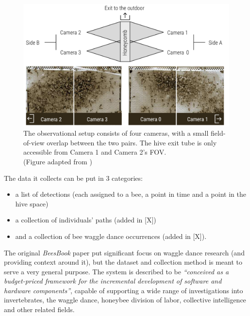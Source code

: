 \begin{figure}[htbp!] 
\centering    
\includegraphics[width=1.0\textwidth]{Chapters/Chapter1/Figs/hive-layout-schlegel.png}
\caption[hive-layout-schlegel]{The observational setup consists of four cameras, with a small field-of-view overlap between the two pairs. The hive exit tube is only accessible from Camera 1 and Camera 2's FOV.
\\(Figure adapted from \cite{schlegel_temporal_2017})}
\label{fig:hive-layout-schlegel}
\end{figure}




The data it collects can be put in 3 categories: 
\begin{itemize}
    \item a list of detections (each assigned to a bee, a point in time and a
    point in the hive space) 
    \item a collection of individuals’ paths (added in [X])
    \item and a collection of bee waggle dance occurrences (added in [X]). 
\end{itemize}



The original \textit{BeesBook} paper put significant focus on waggle dance
research (and providing context around it), but the dataset and collection 
method is meant to serve a very general purpose. 
The system is described to be \textit{“conceived as a budget-priced framework
for the incremental development of software and hardware components”}, capable of
supporting a wide range of investigations into invertebrates, the waggle dance,
honeybee division of labor, collective intelligence and other related fields.



